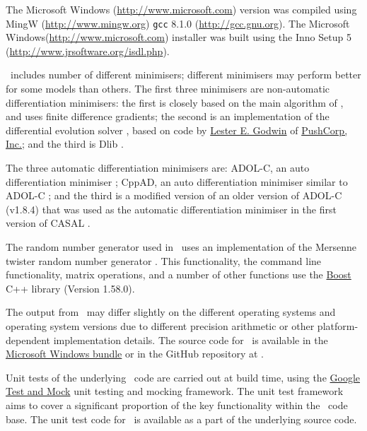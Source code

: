 The Microsoft Windows (\url{http://www.microsoft.com}) version was compiled using MingW (\url{http://www.mingw.org}) \texttt{gcc} 8.1.0 (\url{http://gcc.gnu.org}). The Microsoft Windows(\url{http://www.microsoft.com}) installer was built using the Inno Setup 5 (\url{http://www.jrsoftware.org/isdl.php}).

\CNAME\ includes number of different minimisers; different minimisers may perform better for some models than others. The first three minimisers are non-automatic differentiation minimisers: the first is closely based on the main algorithm of \cite{779}, and uses finite difference gradients; the second is an implementation of the differential evolution solver \citep{1442}, based on code by \href{mailto:<godwin@pushcorp.com>}{Lester E. Godwin} of \href{http://www.pushcorp.com}{PushCorp, Inc.}; and the third is Dlib \citep{dlib09}.

The three automatic differentiation minimisers are: ADOL-C, an auto differentiation minimiser \citep{walther1996adolc}; CppAD, an auto differentiation minimiser similar to ADOL-C \citep{wachter2006cppad}; and the third is a modified version of an older version of ADOL-C (v1.8.4) that was used as the automatic differentiation minimiser in the first version of CASAL \citep{1388}.

The random number generator used in \CNAME\ uses an implementation of the Mersenne twister random number generator \citep{796}. This functionality, the command line functionality, matrix operations, and a number of other functions use the \href{http://www.boost.org/}{Boost} C++ library (Version 1.58.0).

The output from \CNAME\ may differ slightly on the different operating systems and operating system versions due to different precision arithmetic or other platform-dependent implementation details. The source code for \CNAME\ is available in the \href{ftp://ftp.niwa.co.nz/incoming/CASAL2_auto_build/casal2.tar.gz}{Microsoft Windows bundle} or in the GitHub repository at \github .

Unit tests of the underlying \CNAME\ code are carried out at build time, using the \href{https://github.com/google/googletest}{Google Test and Mock} unit testing and mocking framework. The unit test framework aims to cover a significant proportion of the key functionality within the \CNAME\ code base. The unit test code for \CNAME\ is available as a part of the underlying source code.

